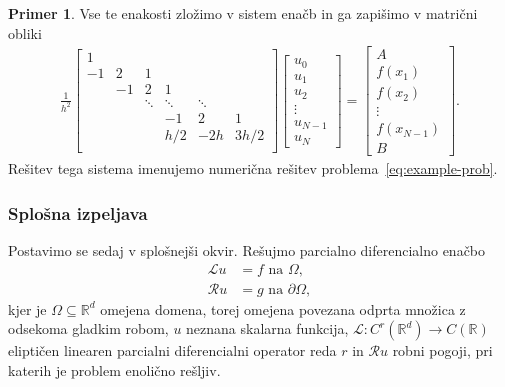 \documentclass[12pt,a4paper,twoside]{article}
\theoremstyle{definition} %
\newtheorem{primer}[definicija]{Primer}
\theoremstyle{plain} %
\numberwithin{equation}{section}
\newcommand{\R}{\mathbb R}
\newcommand{\Rc}{\mathcal{R}}
\renewcommand{\L}{\mathcal{L}}
\begin{document}
\begin{primer}
Vse te enakosti zložimo v sistem enačb in ga zapišimo v matrični obliki
\begin{align}
  \frac{1}{h^2}
  \begin{bmatrix}
    1 &  \\
    -1 & 2 & 1 \\
    & -1 & 2 & 1 \\
    & & \!\ddots & \!\ddots & \! \ddots \\
    &&& -1 & 2 & 1 \\
    &&& h/2 & -2h & 3h/2 \\
  \end{bmatrix}
\begin{bmatrix}
  u_0 \\ u_1 \\ u_2 \\ \vdots \\ u_{N-1} \\ u_N
\end{bmatrix}
 =
 \begin{bmatrix}
   A \\
   f(x_1) \\
   f(x_2) \\
   \vdots \\
   f(x_{N-1}) \\
   B
 \end{bmatrix}.
\end{align}
Rešitev tega sistema imenujemo numerična rešitev problema~\eqref{eq:example-prob}.
\end{primer}

\subsubsection{Splošna izpeljava}
\label{sec:splosna-izpeljava}
Postavimo se sedaj v splošnejši okvir.
Rešujmo parcialno diferencialno enačbo
\begin{align}
  \L u &= f \text{ na } \Omega, \label{eq:general-problem} \\
  \Rc u &= g \text{ na } \partial \Omega \nonumber,
\end{align}
kjer je $\Omega \subseteq \R^d$ omejena domena, torej omejena povezana odprta množica z odsekoma
gladkim robom, $u$ neznana skalarna funkcija, $\L\colon C^r(\R^d) \to C(\R)$ eliptičen linearen
parcialni diferencialni operator reda $r$ in $\Rc u$ robni pogoji, pri katerih je problem enolično
rešljiv.
\end{document}
